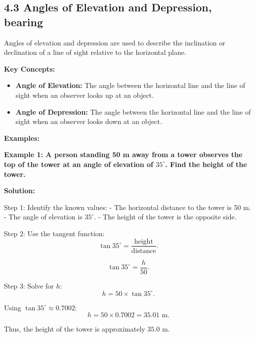 
\subsection*{4.3 Angles of Elevation and Depression, bearing}
Angles of elevation and depression are used to describe the inclination or declination of a line of sight relative to the horizontal plane.

\textbf{Key Concepts:}

\begin{itemize}
	\item \textbf{Angle of Elevation:} The angle between the horizontal line and the line of sight when an observer looks up at an object.
	\item \textbf{Angle of Depression:} The angle between the horizontal line and the line of sight when an observer looks down at an object.
	
\end{itemize}

\textbf{Examples:}

\begin{flushleft}
	\textbf{Example 1: A person standing 50 m away from a tower observes the top of the tower at an angle of elevation of $35^\circ$. Find the height of the tower.}
	
	\vspace{0.5cm}
	\textbf{Solution:}
	\vspace{0.5cm}
	
	Step 1: Identify the known values:
	- The horizontal distance to the tower is 50 m.
	- The angle of elevation is $35^\circ$.
	- The height of the tower is the opposite side.
	
	Step 2: Use the tangent function:
	\[
	\tan 35^\circ = \frac{\text{height}}{\text{distance}}.
	\]
	
	\[
	\tan 35^\circ = \frac{h}{50}.
	\]
	
	Step 3: Solve for $h$:
	\[
	h = 50 \times \tan 35^\circ.
	\]
	
	Using $\tan 35^\circ \approx 0.7002$:
	\[
	h = 50 \times 0.7002 = 35.01 \text{ m}.
	\]
	
	Thus, the height of the tower is approximately $35.0$ m.
\end{flushleft}

